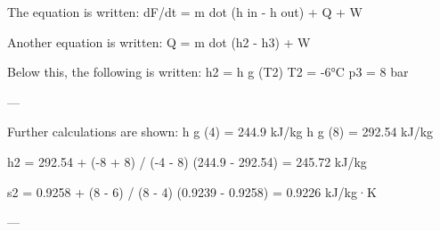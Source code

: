The equation is written:  
dF/dt = m dot (h in - h out) + Q + W  

Another equation is written:  
Q = m dot (h2 - h3) + W  

Below this, the following is written:  
h2 = h g (T2)  
T2 = -6°C  
p3 = 8 bar  

---

Further calculations are shown:  
h g (4) = 244.9 kJ/kg  
h g (8) = 292.54 kJ/kg  

h2 = 292.54 + (-8 + 8) / (-4 - 8) (244.9 - 292.54)  
= 245.72 kJ/kg  

s2 = 0.9258 + (8 - 6) / (8 - 4) (0.9239 - 0.9258)  
= 0.9226 kJ/kg·K  

---